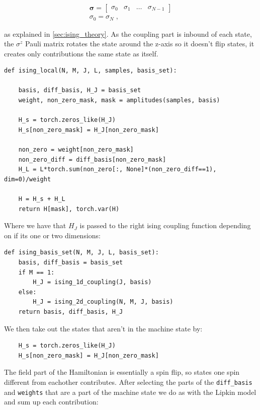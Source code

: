 \begin{equation}
  \begin{gather}
  \mathbf{\sigma} = \begin{bmatrix} \sigma_0 & \sigma_1 & \dots & \sigma_{N-1}\end{bmatrix} \\
  \sigma_0 = \sigma_N \; ,
  \label{eq:ising_boundary_imp}
\end{gather}
\end{equation}

as explained in \ref{sec:ising_theory}. As the coupling part is inbound of each state, the $\sigma^z$ Pauli matrix rotates the state around the z-axis so it doesn't flip states, it creates only contributions the same state as itself.

\begin{verbatim}
def ising_local(N, M, J, L, samples, basis_set):
    
    basis, diff_basis, H_J = basis_set
    weight, non_zero_mask, mask = amplitudes(samples, basis)
  
    H_s = torch.zeros_like(H_J)
    H_s[non_zero_mask] = H_J[non_zero_mask]

    non_zero = weight[non_zero_mask]
    non_zero_diff = diff_basis[non_zero_mask]
    H_L = L*torch.sum(non_zero[:, None]*(non_zero_diff==1), dim=0)/weight
    
    H = H_s + H_L
    return H[mask], torch.var(H)
\end{verbatim}

Where we have that $H_J$ is passed to the right ising coupling function depending on if its one or two dimensions:

\begin{verbatim}
def ising_basis_set(N, M, J, L, basis_set):
    basis, diff_basis = basis_set
    if M == 1:
        H_J = ising_1d_coupling(J, basis)
    else:
        H_J = ising_2d_coupling(N, M, J, basis)
    return basis, diff_basis, H_J
\end{verbatim}

We then take out the states that aren't in the machine state by:

\begin{verbatim}
    H_s = torch.zeros_like(H_J)
    H_s[non_zero_mask] = H_J[non_zero_mask]
\end{verbatim}

The field part of the Hamiltonian is essentially a spin flip, so states one spin different from eachother contributes. After selecting the parts of the \texttt{diff_basis} and \texttt{weights} that are a part of the machine state we do as with the Lipkin model and sum up each contribution:

